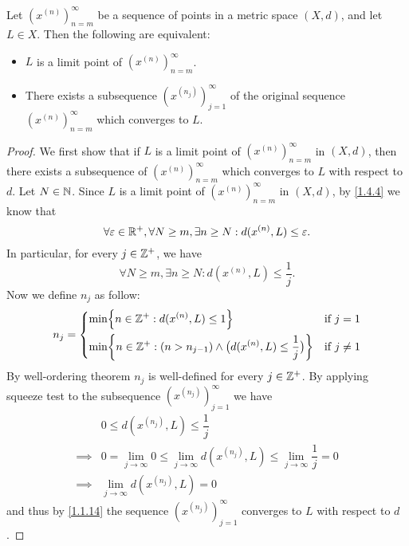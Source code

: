 \begin{prop}\label{1.4.5}
  Let \((x^{(n)})_{n = m}^\infty\) be a sequence of points in a metric space \((X, d)\), and let \(L \in X\).
  Then the following are equivalent:
  \begin{itemize}
    \item \(L\) is a limit point of \((x^{(n)})_{n = m}^\infty\).
    \item There exists a subsequence \((x^{(n_j)})_{j = 1}^\infty\) of the original sequence \((x^{(n)})_{n = m}^\infty\) which converges to \(L\).
  \end{itemize}
\end{prop}

\begin{proof}
  We first show that if \(L\) is a limit point of \((x^{(n)})_{n = m}^\infty\) in \((X, d)\), then there exists a subsequence of \((x^{(n)})_{n = m}^\infty\) which converges to \(L\) with respect to \(d\).
  Let \(N \in \mathbb{N}\).
  Since \(L\) is a limit point of \((x^{(n)})_{n = m}^\infty\) in \((X, d)\), by \cref{1.4.4} we know that
  \[
    \forall \varepsilon \in \mathbb{R}^+, \forall N \geq m, \exists n \geq N : d(x^{(n)}, L) \leq \varepsilon.
  \]
  In particular, for every \(j \in \mathbb{Z}^+\), we have
  \[
    \forall N \geq m, \exists n \geq N : d(x^{(n)}, L) \leq \dfrac{1}{j}.
  \]
  Now we define \(n_j\) as follow:
  \[
    n_j = \begin{dcases}
      \min\set{n \in \Z^+ : d(x^{(n)}, L) \leq 1}                                            & \text{if } j = 1    \\
      \min\set{n \in \Z^+ : (n > n_{j - 1}) \land \big(d(x^{(n)}, L) \leq \dfrac{1}{j}\big)} & \text{if } j \neq 1
    \end{dcases}
  \]
  By well-ordering theorem \(n_j\) is well-defined for every \(j \in \mathbb{Z}^+\).
  By applying squeeze test to the subsequence \((x^{(n_j)})_{j = 1}^\infty\) we have
  \begin{align*}
             & 0 \leq d(x^{(n_j)}, L) \leq \dfrac{1}{j}                                                                     \\
    \implies & 0 = \lim_{j \to \infty} 0 \leq \lim_{j \to \infty} d(x^{(n_j)}, L) \leq \lim_{j \to \infty} \dfrac{1}{j} = 0 \\
    \implies & \lim_{j \to \infty} d(x^{(n_j)}, L) = 0
  \end{align*}
  and thus by \cref{1.1.14} the sequence \((x^{(n_j)})_{j = 1}^\infty\) converges to \(L\) with respect to \(d\).


\end{proof}
